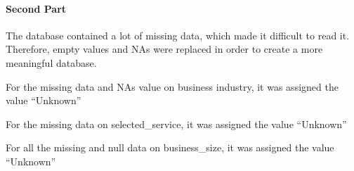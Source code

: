 \documentclass[]{article}
\newenvironment{Shaded}{\begin{snugshade}}{\end{snugshade}}
\newcommand{\KeywordTok}[1]{\textcolor[rgb]{0.13,0.29,0.53}{\textbf{#1}}}
\newcommand{\DataTypeTok}[1]{\textcolor[rgb]{0.13,0.29,0.53}{#1}}
\newcommand{\StringTok}[1]{\textcolor[rgb]{0.31,0.60,0.02}{#1}}
\newcommand{\OperatorTok}[1]{\textcolor[rgb]{0.81,0.36,0.00}{\textbf{#1}}}
\newcommand{\NormalTok}[1]{#1}
\let\oldparagraph\paragraph
\renewcommand{\paragraph}[1]{\oldparagraph{#1}\mbox{}}
\begin{document}
\paragraph{Second Part}\label{second-part}

The database contained a lot of missing data, which made it difficult to
read it. Therefore, empty values and NAs were replaced in order to
create a more meaningful database.

For the missing data and NAs value on business industry, it was assigned
the value ``Unknown''

\begin{Shaded}
\end{Shaded}

For the missing data on selected\_service, it was assigned the value
``Unknown''

\begin{Shaded}
\end{Shaded}

For all the missing and null data on business\_size, it was assigned the
value ``Unknown''

\begin{Shaded}
\end{Shaded}
\end{document}
